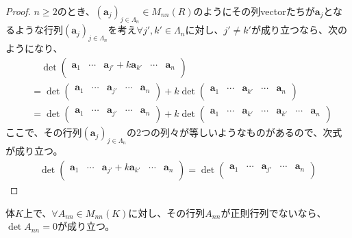 \documentclass[dvipdfmx]{jsarticle}
\begin{document}
\begin{proof}
$n \geq 2$のとき、$\left( \mathbf{a}_{j} \right)_{j \in \varLambda_{n}} \in M_{nn}(R)$のようにその列vectorたちが$\mathbf{a}_{j}$となるような行列$\left( \mathbf{a}_{j} \right)_{j \in \varLambda_{n}}$を考え$\forall j',k' \in \varLambda_{n}$に対し、$j' \neq k'$が成り立つなら、次のようになり、
\begin{align*}
&\quad \det\begin{pmatrix}
\mathbf{a}_{1} & \cdots & \mathbf{a}_{j'} + k\mathbf{a}_{k'} & \cdots & \mathbf{a}_{n} \\
\end{pmatrix}\\
&= \det\begin{pmatrix}
\mathbf{a}_{1} & \cdots & \mathbf{a}_{j'} & \cdots & \mathbf{a}_{n} \\
\end{pmatrix} + k\det\begin{pmatrix}
\mathbf{a}_{1} & \cdots & \mathbf{a}_{k'} & \cdots & \mathbf{a}_{n} \\
\end{pmatrix}\\
&= \det\begin{pmatrix}
\mathbf{a}_{1} & \cdots & \mathbf{a}_{j'} & \cdots & \mathbf{a}_{n} \\
\end{pmatrix} + k\det\begin{pmatrix}
\mathbf{a}_{1} & \cdots & \mathbf{a}_{k'} & \cdots & \mathbf{a}_{k'} & \cdots & \mathbf{a}_{n} \\
\end{pmatrix}
\end{align*}
ここで、その行列$\left( \mathbf{a}_{j} \right)_{j \in \varLambda_{n}}$の2つの列々が等しいようなものがあるので、次式が成り立つ。
\begin{align*}
\det\begin{pmatrix}
\mathbf{a}_{1} & \cdots & \mathbf{a}_{j'} + k\mathbf{a}_{k'} & \cdots & \mathbf{a}_{n} \\
\end{pmatrix} = \det\begin{pmatrix}
\mathbf{a}_{1} & \cdots & \mathbf{a}_{j'} & \cdots & \mathbf{a}_{n} \\
\end{pmatrix}
\end{align*}
\end{proof}
\begin{thm}\label{2.1.11.7}
体$K$上で、$\forall A_{nn} \in M_{nn}(K)$に対し、その行列$A_{nn}$が正則行列でないなら、$\det A_{nn} = 0$が成り立つ。
\end{thm}
\end{document}
